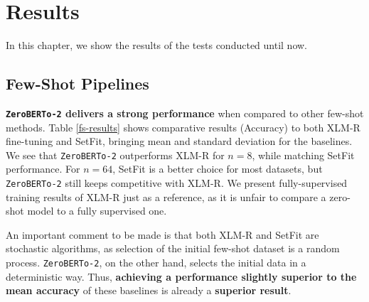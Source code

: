 \documentclass[]{politex-xico}
\begin{document}

\chapter{Results}
\label{chapter_result}

In this chapter, we show the results of the tests conducted until now.

\section{Few-Shot Pipelines}

\textbf{\texttt{ZeroBERTo-2} delivers a strong performance} when compared to other few-shot methods. Table \ref{fs-results} shows comparative results (Accuracy) to both XLM-R fine-tuning and SetFit, bringing mean and standard deviation for the baselines. We see that \texttt{ZeroBERTo-2} outperforms XLM-R for $n = 8$, while matching SetFit performance. For $n = 64$, SetFit is a better choice for most datasets, but \texttt{ZeroBERTo-2} still keeps competitive with XLM-R. We present fully-supervised training results of XLM-R just as a reference, as it is unfair to compare a zero-shot model to a fully supervised one.

An important comment to be made is that both XLM-R and SetFit are stochastic algorithms, as selection of the initial few-shot dataset is a random process. \texttt{ZeroBERTo-2}, on the other hand, selects the initial data in a deterministic way. Thus, \textbf{achieving a performance slightly superior to the mean accuracy} of these baselines is already a \textbf{superior result}.
\end{document}
